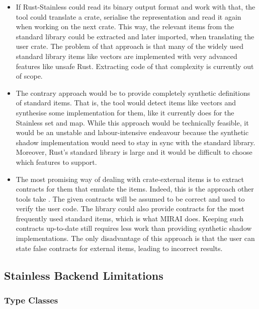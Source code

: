 \begin{itemize}

\item If Rust-Stainless could read its binary output format and work with that,
the tool could translate a crate, serialise the representation and read it again
when working on the next crate. This way, the relevant items from the standard
library could be extracted and later imported, when translating the user crate.
The problem of that approach is that many of the widely used standard library
items like vectors are implemented with very advanced features like unsafe Rust.
Extracting code of that complexity is currently out of scope.

\item The contrary approach would be to provide completely synthetic definitions
of standard items. That is, the tool would detect items like vectors and
synthesise some implementation for them, like it currently does for the
Stainless set and map. While this approach would be technically feasible, it
would be an unstable and labour-intensive endeavour because the synthetic shadow
implementation would need to stay in sync with the standard library. Moreover,
Rust's standard library is large and it would be difficult to choose which
features to support.

\item The most promising way of dealing with crate-external items is to extract
contracts for them that emulate the items. Indeed, this is the approach other
tools take \cite{prusti, mirai}. The given contracts will be assumed to be
correct and used to verify the user code. The library could also provide
contracts for the most frequently used standard items, which is what MIRAI
\cite{mirai} does. Keeping such contracts up-to-date still requires less work
than providing synthetic shadow implementations. The only disadvantage of this
approach is that the user can state false contracts for external items, leading
to incorrect results.

\end{itemize}

\subsection{Stainless Backend Limitations}

\subsubsection{Type Classes}

